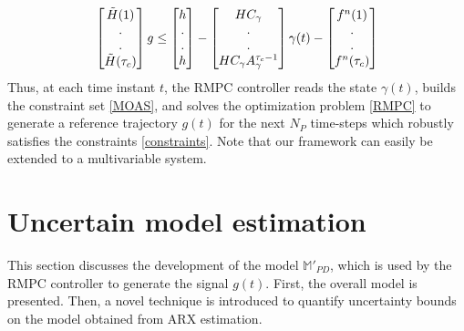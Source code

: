 \documentclass[letterpaper, 10 pt, conference]{ieeeconf}  %
\begin{document}
	 \begin{equation}
	 \begin{bmatrix}
	 \tilde{H}(1) \vspace{0.001cm} \\
	 . \vspace{0.001cm} \\
	 . \vspace{0.001cm} \\
	 \tilde{H}(\tau_c)
	 \end{bmatrix} g \leq
	 \begin{bmatrix}
	 h \vspace{0.001cm} \\
	 . \vspace{0.001cm} \\
	 . \vspace{0.001cm} \\
	 h
	 \end{bmatrix} - 
	 \begin{bmatrix}
	 HC_{\gamma} \vspace{0.001cm} \\
	 . \vspace{0.001cm} \\
	 . \vspace{0.001cm} \\
	 HC_{\gamma}A_{\gamma}^{\tau_c - 1}
	 \end{bmatrix}\gamma(t) - 
	 \begin{bmatrix}
	 f^n(1) \vspace{0.001cm} \\
	 . \vspace{0.001cm} \\
	 . \vspace{0.001cm} \\
	 f^n(\tau_c)
	 \end{bmatrix}
	 \label{MOAS}
	 \end{equation}
	 Thus, at each time instant $t$, the RMPC controller reads the state $\gamma(t)$, builds the constraint set \eqref{MOAS}, and solves the optimization problem \eqref{RMPC} to generate a reference trajectory $g(t)$ for the next $N_P$ time-steps which robustly satisfies the constraints \eqref{constraints}. Note that our framework can easily be extended to a multivariable system.
	 
	\section{Uncertain model estimation}
	\label{Contribution}
	This section discusses the development of the model $\mathbb{M}'_{PD}$, which is used by the RMPC controller to generate the signal $g(t)$. First, the overall model is presented. Then, a novel technique is introduced to quantify uncertainty bounds on the model obtained from ARX estimation.
\end{document}
